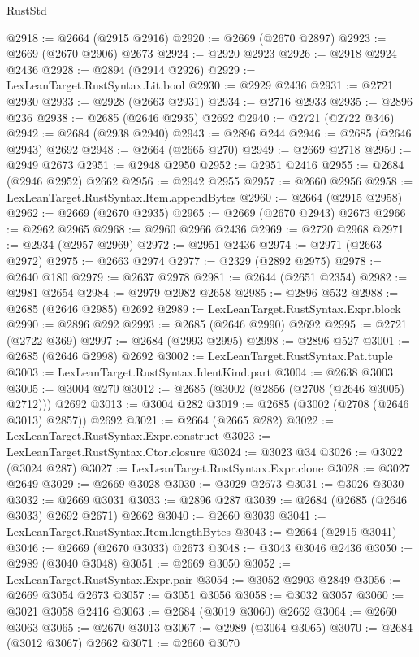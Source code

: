 \begin{lexlean}{RustStd}
\begin{coremodule}
@2918 := @2664 (@2915 @2916)
@2920 := @2669 (@2670 @2897)
@2923 := @2669 (@2670 @2906) @2673
@2924 := @2920 @2923
@2926 := @2918 @2924 @2436
@2928 := @2894 (@2914 @2926)
@2929 := LexLeanTarget.RustSyntax.Lit.bool
@2930 := @2929 @2436
@2931 := @2721 @2930
@2933 := @2928 (@2663 @2931)
@2934 := @2716 @2933
@2935 := @2896 @236
@2938 := @2685 (@2646 @2935) @2692
@2940 := @2721 (@2722 @346)
@2942 := @2684 (@2938 @2940)
@2943 := @2896 @244
@2946 := @2685 (@2646 @2943) @2692
@2948 := @2664 (@2665 @270)
@2949 := @2669 @2718
@2950 := @2949 @2673
@2951 := @2948 @2950
@2952 := @2951 @2416
@2955 := @2684 (@2946 @2952) @2662
@2956 := @2942 @2955
@2957 := @2660 @2956
@2958 := LexLeanTarget.RustSyntax.Item.appendBytes
@2960 := @2664 (@2915 @2958)
@2962 := @2669 (@2670 @2935)
@2965 := @2669 (@2670 @2943) @2673
@2966 := @2962 @2965
@2968 := @2960 @2966 @2436
@2969 := @2720 @2968
@2971 := @2934 (@2957 @2969)
@2972 := @2951 @2436
@2974 := @2971 (@2663 @2972)
@2975 := @2663 @2974
@2977 := @2329 (@2892 @2975)
@2978 := @2640 @180
@2979 := @2637 @2978
@2981 := @2644 (@2651 @2354)
@2982 := @2981 @2654
@2984 := @2979 @2982 @2658
@2985 := @2896 @532
@2988 := @2685 (@2646 @2985) @2692
@2989 := LexLeanTarget.RustSyntax.Expr.block
@2990 := @2896 @292
@2993 := @2685 (@2646 @2990) @2692
@2995 := @2721 (@2722 @369)
@2997 := @2684 (@2993 @2995)
@2998 := @2896 @527
@3001 := @2685 (@2646 @2998) @2692
@3002 := LexLeanTarget.RustSyntax.Pat.tuple
@3003 := LexLeanTarget.RustSyntax.IdentKind.part
@3004 := @2638 @3003
@3005 := @3004 @270
@3012 := @2685 (@3002 (@2856 (@2708 (@2646 @3005) @2712))) @2692
@3013 := @3004 @282
@3019 := @2685 (@3002 (@2708 (@2646 @3013) @2857)) @2692
@3021 := @2664 (@2665 @282)
@3022 := LexLeanTarget.RustSyntax.Expr.construct
@3023 := LexLeanTarget.RustSyntax.Ctor.closure
@3024 := @3023 @34
@3026 := @3022 (@3024 @287)
@3027 := LexLeanTarget.RustSyntax.Expr.clone
@3028 := @3027 @2649
@3029 := @2669 @3028
@3030 := @3029 @2673
@3031 := @3026 @3030
@3032 := @2669 @3031
@3033 := @2896 @287
@3039 := @2684 (@2685 (@2646 @3033) @2692 @2671) @2662
@3040 := @2660 @3039
@3041 := LexLeanTarget.RustSyntax.Item.lengthBytes
@3043 := @2664 (@2915 @3041)
@3046 := @2669 (@2670 @3033) @2673
@3048 := @3043 @3046 @2436
@3050 := @2989 (@3040 @3048)
@3051 := @2669 @3050
@3052 := LexLeanTarget.RustSyntax.Expr.pair
@3054 := @3052 @2903 @2849
@3056 := @2669 @3054 @2673
@3057 := @3051 @3056
@3058 := @3032 @3057
@3060 := @3021 @3058 @2416
@3063 := @2684 (@3019 @3060) @2662
@3064 := @2660 @3063
@3065 := @2670 @3013
@3067 := @2989 (@3064 @3065)
@3070 := @2684 (@3012 @3067) @2662
@3071 := @2660 @3070

\end{coremodule}
\end{lexlean}
